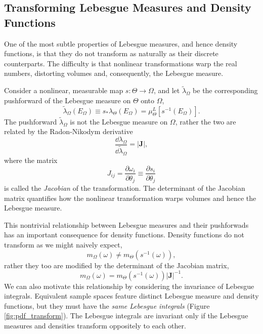 \subsection{Transforming Lebesgue Measures and Density Functions}

One of the most subtle properties of Lebesgue measures, and
hence density functions, is that they do not transform as naturally
as their discrete counterparts.  The difficulty is that nonlinear
transformations warp the real numbers, distorting volumes and,
consequently, the Lebesgue measure.  

Consider a nonlinear, measurable map $s : \Theta \rightarrow \Omega$,
and let $\tilde{\lambda}_{\Omega}$ be the corresponding pushforward 
of the Lebesgue measure on $\Theta$ onto $\Omega$,
%
\begin{equation*}
\tilde{\lambda}_{\Omega} \! \left( E_{\Omega} \right)
\equiv
s_{*} \lambda_{\Theta} \! \left( E_{\Omega} \right)
=
\mu^{L}_{\Theta} \! \left[ s^{-1} \! \left( E_{\Omega} \right) \right].
\end{equation*}
%
The pushforward $\tilde{\lambda}_{\Omega}$ is not the Lebesgue 
measure on $\Omega$, rather the two are related by the Radon-Nikodym
derivative
%
\begin{equation*}
\frac{ \dd \lambda_{\Omega} }
{\dd \tilde{\lambda}_{\Omega} }
=
\left| \mathbf{J} \right|,
\end{equation*}
%
where the matrix
%
\begin{equation*}
J_{ij} 
= 
\frac{\partial \omega_{i} }{ \partial \theta_{j} }
\equiv 
\frac{ \partial s_{i} }{ \partial \theta_{j} }
\end{equation*} 
%
is called the \emph{Jacobian} of the transformation.  The determinant
of the Jacobian matrix quantifies how the nonlinear transformation 
warps volumes and hence the Lebesgue measure.

This nontrivial relationship between Lebesgue measures and their
pushforwads has an important consequence for density functions.  
Density functions do not transform as we might naively expect,
%
\begin{equation*}
m_{\Omega} \! \left( \omega \right) 
\ne 
m_{\Theta} \! \left( s^{-1} \! \left( \omega \right) \right),
\end{equation*}
%
rather they too are modified by the determinant of the Jacobian matrix,
%
\begin{equation*}
m_{\Omega} \! \left( \omega \right) 
= 
m_{\Theta} \! \left( s^{-1} \! \left( \omega \right) \right) | \mathbf{J} |^{-1}.
\end{equation*}
%
We can also motivate this relationship by considering the invariance
of Lebesgue integrals.  Equivalent sample spaces feature distinct
Lebesgue measure and density functions, but they must have the
\emph{same Lebesgue integrals} (Figure \ref{fig:pdf_transform}).
The Lebesgue integrals are invariant only if the Lebesgue measures
and densities transform oppositely to each other.

